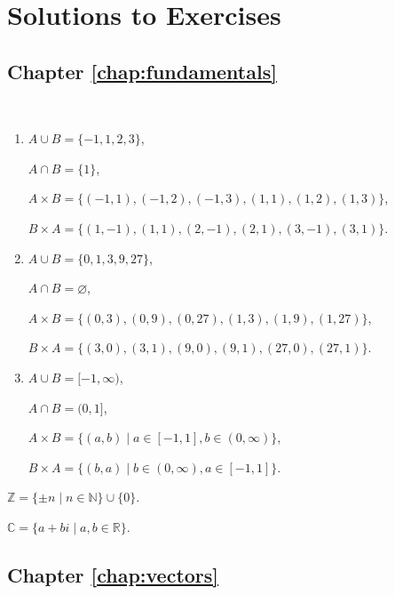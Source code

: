 \chapter{Solutions to Exercises}
\footnotesize

\section*{Chapter \ref{chap:fundamentals}}

\begin{sltn}[\ref{exer:setops}]~
\begin{enumerate}[label=(\alph*)]
    \item $ A\cup B=\{-1,1,2,3\} $,
    
    $ A\cap B=\{1\} $,

    $ A\times B=\{(-1,1),(-1,2),(-1,3),(1,1),(1,2),(1,3)\} $,

    $ B\times A=\{(1,-1),(1,1),(2,-1),(2,1),(3,-1),(3,1)\} $.

    \item $ A\cup B=\{0,1,3,9,27\} $,
    
    $ A\cap B=\varnothing $,

    $ A\times B=\{(0,3),(0,9),(0,27),(1,3),(1,9),(1,27)\} $,

    $ B\times A=\{(3,0),(3,1),(9,0),(9,1),(27,0),(27,1)\} $.

    \item $ A\cup B=[-1,\infty) $,
    
    $ A\cap B=(0,1] $,

    $ A\times B=\{(a,b)\mid a\in[-1,1],b\in(0,\infty)\} $,

    $ B\times A=\{(b,a)\mid b\in(0,\infty),a\in[-1,1]\} $.\qedhere
\end{enumerate}
\end{sltn}

\begin{sltn}[\ref{exer:Z}]
$ \mathbb{Z}=\{\pm n\mid n\in\mathbb{N}\}\cup\{0\} $.
\end{sltn}

\begin{sltn}[\ref{exer:C}]
$ \mathbb{C}=\{a+bi\mid a,b\in\mathbb{R}\} $.
\end{sltn}

\section*{Chapter \ref{chap:vectors}}

